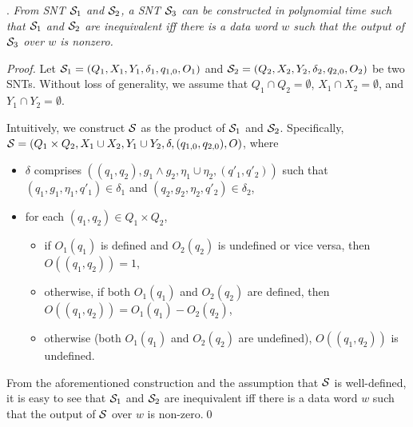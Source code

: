\begin{appendix}
.
\emph{From SNT ${\mathcal{S} }_1$ and ${\mathcal{S} }_2$, a SNT ${\mathcal{S} }_3$ can be constructed in polynomial time such that ${\mathcal{S} }_1$ and ${\mathcal{S} }_2$ are  inequivalent iff there is a data word $w$ such that the output of ${\mathcal{S} }_3$ over $w$ is nonzero.}

\begin{proof}
Let ${\mathcal{S} }_1 = (Q_1,X_1,Y_1,\delta_1,q_{1,0}, O_1)$ and  ${\mathcal{S} }_2 = (Q_2,X_2,Y_2,\delta_2,q_{2,0}, O_2)$ be two SNTs. Without loss of generality, we assume that $Q_1 \cap Q_2 = \emptyset$, $X_1 \cap X_2 = \emptyset$, and $Y_1 \cap Y_2 = \emptyset$. 

Intuitively, we construct ${\mathcal{S} }$ as the product of ${\mathcal{S} }_1$ and ${\mathcal{S} }_2$. Specifically, ${\mathcal{S} }=(Q_1 \times Q_2, X_1 \cup X_2, Y_1 \cup Y_2, \delta, (q_{1,0},q_{2,0}), O)$, where
\begin{itemize}
\item $\delta$ comprises $((q_1,q_2), g_1 \wedge g_2, \eta_1 \cup \eta_2, (q'_1,q'_2))$ such that $(q_1,g_1,\eta_1,q'_1) \in \delta_1$ and $(q_2,g_2,\eta_2,q'_2) \in \delta_2$,
%
\item for each $(q_1,q_2) \in Q_1 \times Q_2$, 
\begin{itemize}
\item if $O_1(q_1)$ is defined and $O_2(q_2)$ is undefined or vice versa, then $O((q_1,q_2))=1$, 
%
\item otherwise, if both $O_1(q_1)$ and $O_2(q_2)$ are defined, then $O((q_1,q_2))=O_1(q_1) - O_2(q_2)$, 
%
\item otherwise (both $O_1(q_1)$ and $O_2(q_2)$ are undefined), $O((q_1,q_2))$ is undefined. 
\end{itemize}
\end{itemize}
From the aforementioned construction and the assumption that ${\mathcal{S} }$ is well-defined, it is easy to see that ${\mathcal{S} }_1$ and ${\mathcal{S} }_2$ are  inequivalent iff there is a data word $w$ such that the output of ${\mathcal{S} }$ over $w$ is non-zero.\qed
\end{proof}




\end{appendix}
